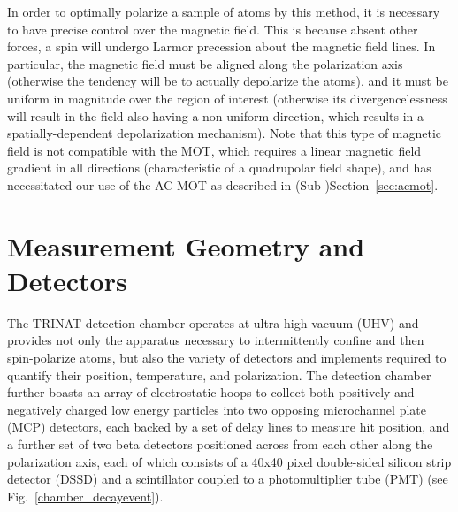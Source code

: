 In order to optimally polarize a sample of atoms by this method, it is necessary to have precise control over the magnetic field.  This is because absent other forces, a spin will undergo Larmor precession about the magnetic field lines.  In particular, the magnetic field must be aligned along the polarization axis (otherwise the tendency will be to actually depolarize the atoms), and it must be uniform in magnitude over the region of interest (otherwise its divergencelessness will result in the field also having a non-uniform direction, which results in a spatially-dependent depolarization mechanism).  Note that this type of magnetic field is not compatible with the MOT, which requires a linear magnetic field gradient in all directions (characteristic of a quadrupolar field shape), and has necessitated our use of the AC-MOT as described in (Sub-)Section~\ref{sec:acmot}. 



\section{Measurement Geometry and Detectors}
\label{sec:geometry}


The TRINAT detection chamber operates at ultra-high vacuum (UHV) and provides not only the apparatus necessary to intermittently confine and then spin-polarize atoms, but also the variety of detectors and implements required to quantify their position, temperature, and polarization.  The detection chamber further boasts an array of electrostatic hoops to collect both positively and negatively charged low energy particles into two opposing microchannel plate (MCP) detectors, each backed by a set of delay lines to measure hit position, and a further set of two beta detectors positioned across from each other along the polarization axis, each of which consists of a 40x40 pixel double-sided silicon strip detector (DSSD) and a scintillator coupled to a photomultiplier tube (PMT) (see Fig.~\ref{chamber_decayevent}). 

